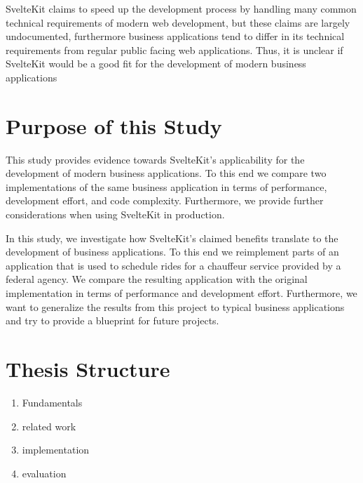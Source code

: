 SvelteKit claims to speed up the development process by handling many common technical requirements of modern web development, but these claims are largely undocumented, furthermore business applications tend to differ in its technical requirements from regular public facing web applications. Thus, it is unclear if SvelteKit would be a good fit for the development of modern business applications

\section{Purpose of this Study}
\label{sec:purpose-of-this-study}
This study provides evidence towards SvelteKit's applicability for the development of modern business applications. To this end we compare two implementations of the same business application in terms of performance, development effort, and code complexity. Furthermore, we provide further considerations when using SvelteKit in production.

In this study, we investigate how SvelteKit's claimed benefits translate to the development of business applications. To this end we reimplement parts of an application that is used to schedule rides for a chauffeur service provided by a federal agency. We compare the resulting application with the original implementation in terms of performance and development effort. Furthermore, we want to generalize the results from this project to typical business applications and try to provide a blueprint for future projects.



\section{Thesis Structure}

\begin{enumerate}
    \item Fundamentals
    \item related work
    \item implementation
    \item evaluation
\end{enumerate}
